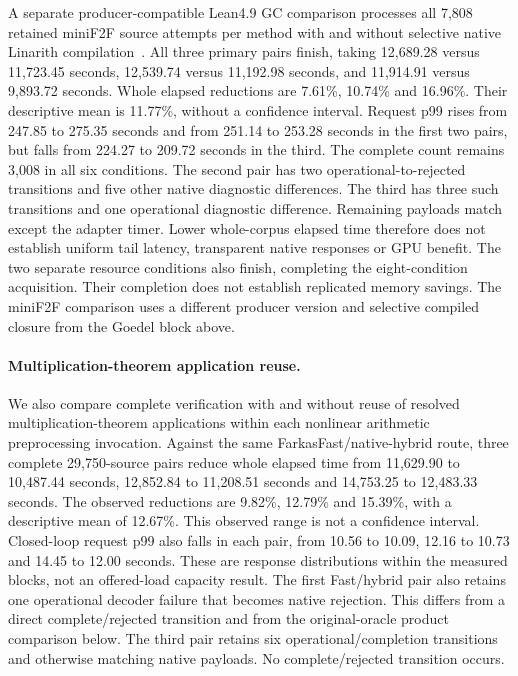 \documentclass[10pt,twocolumn]{article}
\begin{document}
A separate producer-compatible Lean4.9 GC comparison processes all 7,808
retained miniF2F source attempts per method with and without selective native
Linarith compilation~\cite{mathlib}. All three primary pairs finish, taking 12,689.28 versus
11,723.45 seconds, 12,539.74 versus 11,192.98 seconds, and 11,914.91 versus
9,893.72 seconds. Whole elapsed reductions are 7.61\%, 10.74\% and 16.96\%.
Their descriptive mean is 11.77\%, without a confidence interval.
Request p99 rises from 247.85 to 275.35 seconds and from 251.14 to 253.28 seconds
in the first two pairs, but falls from 224.27 to 209.72 seconds in the third.
The complete count remains 3,008 in all six conditions.
The second pair has two operational-to-rejected transitions and five other
native diagnostic differences. The third has three such transitions and one
operational diagnostic difference. Remaining payloads match except the adapter
timer. Lower whole-corpus elapsed time therefore does not establish uniform tail latency,
transparent native responses or GPU benefit. The two separate resource conditions
also finish, completing the eight-condition acquisition. Their completion does
not establish replicated memory savings. The miniF2F comparison uses a different producer version and selective compiled closure from the
Goedel block above.

\paragraph{Multiplication-theorem application reuse.}
We also compare complete verification with and without reuse of resolved
multiplication-theorem applications within each nonlinear arithmetic preprocessing invocation.
Against the same FarkasFast/native-hybrid route, three complete 29,750-source
pairs reduce whole elapsed time from 11,629.90 to 10,487.44 seconds,
12,852.84 to 11,208.51 seconds and 14,753.25 to 12,483.33 seconds.
The observed reductions are 9.82\%, 12.79\% and 15.39\%, with a descriptive mean
of 12.67\%. This observed range is not a confidence interval.
Closed-loop request p99 also falls in each pair, from 10.56 to 10.09, 12.16 to
10.73 and 14.45 to 12.00 seconds. These are response distributions within the
measured blocks, not an offered-load capacity result.
The first Fast/hybrid pair also retains one operational decoder failure that
becomes native rejection. This differs from a direct complete/rejected transition
and from the original-oracle product comparison below.
The third pair retains six operational/completion transitions and otherwise
matching native payloads. No complete/rejected transition occurs.
\end{document}
